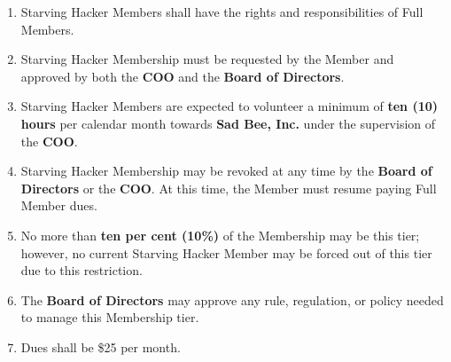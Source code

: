 \documentclass[11pt, oneside]{article} %
\begin{document}
\begin{enumerate}
	\begin{enumerate}
		\item Starving Hacker Members shall have the rights and responsibilities of Full Members.
		\item Starving Hacker Membership must be requested by the Member and approved by both the \textbf{COO} and the \textbf{Board of Directors}.
		\item Starving Hacker Members are expected to volunteer a minimum of \textbf{ten (10) hours} per calendar month towards \textbf{Sad Bee, Inc.} under the supervision of the \textbf{COO}.
		\item Starving Hacker Membership may be revoked at any time by the \textbf{Board of Directors} or the \textbf{COO}.  At this time, the Member must resume paying Full Member dues.
		\item No more than \textbf{ten per cent (10\%)} of the Membership may be this tier; however, no current Starving Hacker Member may be forced out of this tier due to this restriction.
		\item The \textbf{Board of Directors} may approve any rule, regulation, or policy needed to manage this Membership tier.
		\item Dues shall be \$25 per month.
	\end{enumerate}
\end{enumerate}
\end{document}
